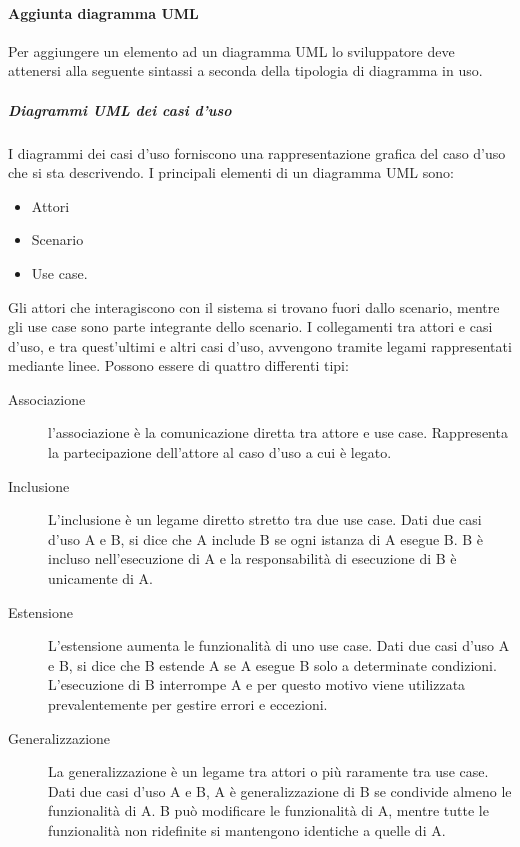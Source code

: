 \documentclass[../../norme-di-progetto.tex]{subfiles}
\begin{document}
\paragraph{Aggiunta diagramma UML}%
\label{par:aggiunta_uml}
Per aggiungere un elemento ad un diagramma UML lo sviluppatore deve attenersi alla seguente sintassi a seconda della tipologia di diagramma in uso.
\subparagraph{Diagrammi UML dei casi d'uso}%
\label{subp:diagrammi_UML_dei_casi_d'uso}
I diagrammi dei casi d'uso forniscono una rappresentazione grafica del caso d'uso che si sta descrivendo. I principali elementi di un diagramma UML sono:
\begin{itemize}
  \item Attori
  \item Scenario
  \item Use case.
\end{itemize}
Gli attori che interagiscono con il sistema si trovano fuori dallo scenario, mentre gli use case sono parte integrante dello scenario.
I collegamenti tra attori e casi d'uso, e tra quest'ultimi e altri casi d'uso, avvengono tramite legami rappresentati mediante linee.
Possono essere di quattro differenti tipi:
\begin{description}
  \item [Associazione] l'associazione è la comunicazione diretta tra attore e use case. Rappresenta la partecipazione dell'attore al caso d'uso a cui è legato.
  \item [Inclusione] L'inclusione è un legame diretto stretto tra due use case. Dati due casi d'uso A e B, si dice che A include B se ogni istanza di A esegue B. B è incluso nell'esecuzione di A e la responsabilità di esecuzione di B è unicamente di A.
  \item [Estensione] L'estensione aumenta le funzionalità di uno use case. Dati due casi d'uso A e B, si dice che B estende A se A esegue B solo a determinate condizioni. L'esecuzione di B interrompe A e per questo motivo viene utilizzata prevalentemente per gestire errori e eccezioni.
  \item [Generalizzazione] La generalizzazione è un legame tra attori o più raramente tra use case. Dati due casi d'uso A e B, A è generalizzazione di B se condivide almeno le funzionalità di A. B può modificare le funzionalità di A, mentre tutte le funzionalità non ridefinite si mantengono identiche a quelle di A.
\end{description}
\end{document}
